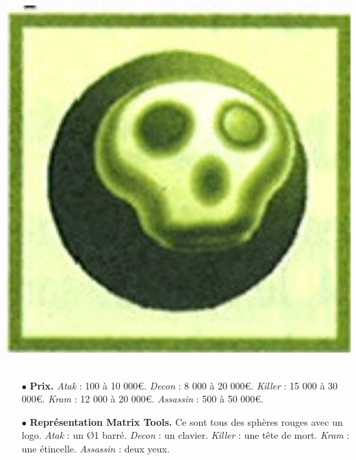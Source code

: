 \documentclass[11pt,twoside,a4paper]{article}
\begin{document}
\begin{multicols*}{2}
\begin{itemize}
\end{itemize}
\begin{minipage}[h]{0.12\textwidth}
	\includegraphics[width=1.20\textwidth]{img/catalogueProgrammesTueur03.jpg}~\\
\end{minipage} \hfill \begin{minipage}[h]{0.37\textwidth}
	\begin{itemize}
		\item[$\bullet$] \textbf{Prix. }\emph{Atak} : 100 {\`a} 10 000\euro . \emph{Decon} : 8 000 {\`a} 20 000\euro .  \emph{Killer} : 15 000 {\`a} 30 000\euro . \emph{Kram} : 12 000 {\`a} 20 000\euro. \emph{Assassin} : 500 {\`a} 50 000\euro . 
	\end{itemize}
\end{minipage}
\begin{itemize} 
	\item[$\bullet$] \textbf{Repr{\'e}sentation Matrix Tools. }Ce sont tous des sph{\`e}res rouges avec un logo. \emph{Atak} : un \O 1 barr{\'e}. \emph{Decon} : un clavier.  \emph{Killer} : une t{\^e}te de mort. \emph{Kram} : une {\'e}tincelle. \emph{Assassin} : deux yeux. 
\end{itemize} %


\end{multicols*}
\end{document}
